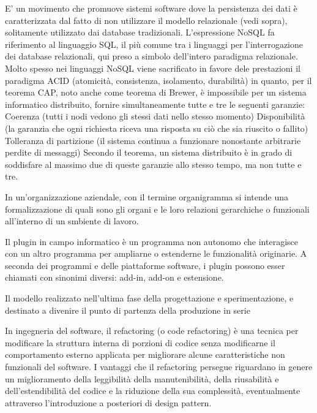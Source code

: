 \documentclass{scalatekids-article}
\begin{document}

   E' un movimento che promuove sistemi software dove la persistenza dei dati è caratterizzata dal fatto di non utilizzare il modello relazionale (vedi sopra), solitamente utilizzato dai database tradizionali.
  L'espressione NoSQL fa riferimento al linguaggio SQL, il più comune tra i linguaggi per l'interrogazione dei database relazionali, qui preso a simbolo dell'intero paradigma relazionale. Molto spesso nei linguaggi NoSQL viene sacrificato in favore dele prestazioni il paradigma ACID (atomicità, consistenza, isolamento, durabilità) in quanto, per il teorema CAP, noto anche come teorema di Brewer, è impossibile per un sistema informatico distribuito, fornire simultaneamente tutte e tre le seguenti garanzie:
  Coerenza (tutti i nodi vedono gli stessi dati nello stesso momento)
  Disponibilità (la garanzia che ogni richiesta riceva una risposta su ciò che sia riuscito o fallito)
  Tolleranza di partizione (il sistema continua a funzionare nonostante arbitrarie perdite di messaggi)
  Secondo il teorema, un sistema distribuito è in grado di soddisfare al massimo due di queste garanzie allo stesso tempo, ma non tutte e tre.


   In un'organizzazione aziendale, con il termine organigramma si intende una formalizzazione di quali sono gli organi e le loro relazioni gerarchiche o funzionali all'interno di un smbiente di lavoro.


   Il plugin in campo informatico è un programma non autonomo che interagisce con un altro programma per ampliarne o estenderne le funzionalità originarie.
  A seconda dei programmi e delle piattaforme software, i plugin possono esser chiamati con sinonimi diversi: add-in, add-on e estensione.

   Il modello realizzato nell’ultima fase della progettazione e sperimentazione, e destinato a divenire il punto di partenza della produzione in serie



   In ingegneria del software, il refactoring (o code refactoring) è una tecnica per modificare la struttura interna di porzioni di codice senza modificarne il comportamento esterno applicata per migliorare alcune caratteristiche non funzionali del software.
  I vantaggi che il refactoring persegue riguardano in genere un miglioramento della leggibilità della manutenibilità, della riusabilità e dell'estendibilità del codice e la riduzione della sua complessità, eventualmente attraverso l'introduzione a posteriori di design pattern.
\end{document}
